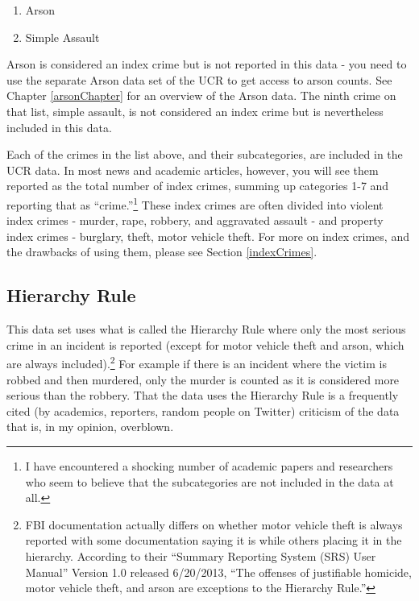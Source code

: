 \documentclass[
]{krantz}
\providecommand{\tightlist}{%
  \setlength{\itemsep}{0pt}\setlength{\parskip}{0pt}}
\begin{document}
\begin{enumerate}
\def\labelenumi{\arabic{enumi}.}
\setcounter{enumi}{7}
\tightlist
\item
  Arson\\
\item
  Simple Assault
\end{enumerate}

Arson is considered an index crime but is not reported in
this data - you need to use the separate Arson data set of
the UCR to get access to arson counts. See Chapter
\ref{arsonChapter} for an overview of the Arson data. The
ninth crime on that list, simple assault, is not considered
an index crime but is nevertheless included in this data.

Each of the crimes in the list above, and their
subcategories, are included in the UCR data. In most news
and academic articles, however, you will see them reported
as the total number of index crimes, summing up categories
1-7 and reporting that as ``crime.''\footnote{I have
  encountered a shocking number of academic papers and
  researchers who seem to believe that the subcategories are
  not included in the data at all.} These index crimes are
often divided into violent index crimes - murder, rape,
robbery, and aggravated assault - and property index crimes
- burglary, theft, motor vehicle theft. For more on index
crimes, and the drawbacks of using them, please see Section
\ref{indexCrimes}.

\subsection{Hierarchy Rule}\label{hierarchy}

This data set uses what is called the Hierarchy Rule where
only the most serious crime in an incident is reported
(except for motor vehicle theft and arson, which are always
included).\footnote{FBI documentation actually differs on
  whether motor vehicle theft is always reported with some
  documentation saying it is while others placing it in the
  hierarchy. According to their ``Summary Reporting System
  (SRS) User Manual'' Version 1.0 released 6/20/2013, ``The
  offenses of justifiable homicide, motor vehicle theft, and
  arson are exceptions to the Hierarchy Rule.''} For example
if there is an incident where the victim is robbed and then
murdered, only the murder is counted as it is considered
more serious than the robbery. That the data uses the
Hierarchy Rule is a frequently cited (by academics,
reporters, random people on Twitter) criticism of the data
that is, in my opinion, overblown.
\end{document}
